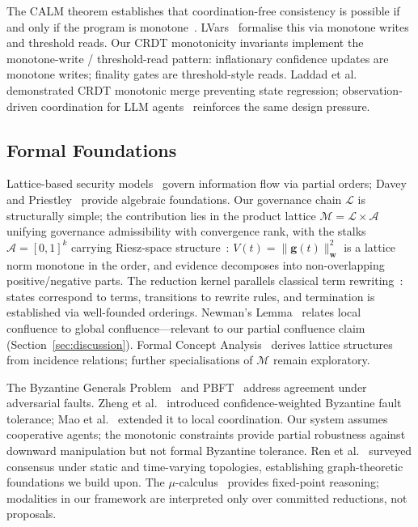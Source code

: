 \documentclass[11pt]{article}
\begin{document}
The CALM theorem establishes that coordination-free consistency is possible if and only if the program is monotone~\cite{hellerstein2019calm,ameloot2025calm}.
LVars~\cite{kuper2013lvars} formalise this via monotone writes and threshold reads.
Our CRDT monotonicity invariants implement the monotone-write / threshold-read pattern: inflationary confidence updates are monotone writes; finality gates are threshold-style reads.
Laddad et al.~\cite{laddad2024} demonstrated CRDT monotonic merge preventing state regression; observation-driven coordination for LLM agents~\cite{codecrdt2025} reinforces the same design pressure.

\subsection{Formal Foundations}

Lattice-based security models~\cite{denning1976,bell1973} govern information flow via partial orders; Davey and Priestley~\cite{davey2002} provide algebraic foundations.
Our governance chain $\mathcal{L}$ is structurally simple; the contribution lies in the product lattice $\mathcal{M} = \mathcal{L} \times \mathcal{A}$ unifying governance admissibility with convergence rank, with the stalks $\mathcal{A} = [0,1]^k$ carrying Riesz-space structure~\cite{ghrist2022}: $V(t) = \|\mathbf{g}(t)\|^2_\mathbf{w}$ is a lattice norm monotone in the order, and evidence decomposes into non-overlapping positive/negative parts.
The reduction kernel parallels classical term rewriting~\cite{baader1998}: states correspond to terms, transitions to rewrite rules, and termination is established via well-founded orderings.
Newman's Lemma~\cite{newman1942} relates local confluence to global confluence---relevant to our partial confluence claim (Section~\ref{sec:discussion}).
Formal Concept Analysis~\cite{ganter1999,wille1982} derives lattice structures from incidence relations; further specialisations of $\mathcal{M}$ remain exploratory.

The Byzantine Generals Problem~\cite{lamport1982} and PBFT~\cite{castro1999} address agreement under adversarial faults.
Zheng et al.~\cite{zheng2025} introduced confidence-weighted Byzantine fault tolerance; Mao et al.~\cite{mao2024} extended it to local coordination.
Our system assumes cooperative agents; the monotonic constraints provide partial robustness against downward manipulation but not formal Byzantine tolerance.
Ren et al.~\cite{ren2005} surveyed consensus under static and time-varying topologies, establishing graph-theoretic foundations we build upon.
The $\mu$-calculus~\cite{kozen1983} provides fixed-point reasoning; modalities in our framework are interpreted only over committed reductions, not proposals.
\end{document}
